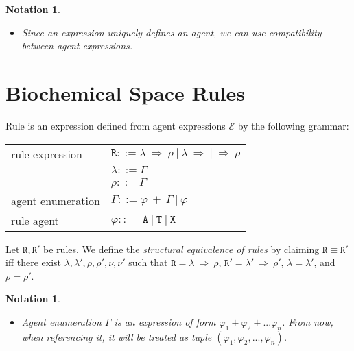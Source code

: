 \documentclass{entcs}
\renewcommand{\~}[0]{\texttildelow}
\newtheorem{notation}[thm]{Notation}
\begin{document}
\begin{notation}
~
\begin{itemize}
\item Since an expression uniquely defines an agent, we can use compatibility between agent expressions.
\end{itemize}
\end{notation}

\section{Biochemical Space Rules}


Rule is an expression defined from agent expressions $\mathcal{E}$ by the following grammar:

\begin{center}
{\small
\hspace*{-1cm}\begin{tabular}{ l l }
 rule expression & $\mathtt{R} ::= \lambda ~\Rightarrow~ \rho ~|~ \lambda ~\Rightarrow ~|~ \Rightarrow~ \rho $\\
  & $\lambda ::= \Gamma$\\
  & $\rho ::= \Gamma$\\
 agent enumeration & $\Gamma ::= \varphi~ +~\Gamma ~|~ \varphi$\\
 rule agent & $\varphi :: = \mathtt{A}~|~\mathtt{T}~|~\mathtt{X}$\\
\end{tabular}
}
\end{center}

\begin{defn}
Let $\mathtt{R},\mathtt{R}'$ be rules. We define the \emph{structural equivalence of rules} by claiming $\mathtt{R} \equiv \mathtt{R}'$ iff there exist $\lambda, \lambda', \rho, \rho', \nu, \nu'$ such that $\mathtt{R}=\lambda ~\Rightarrow~ \rho$, $\mathtt{R}'=\lambda' ~\Rightarrow~ \rho'$, $\lambda=\lambda'$, and $\rho=\rho'$.
\end{defn}

\begin{notation}
~
\begin{itemize}
\item Agent enumeration $\Gamma$ is an expression of form $\varphi_1 + \varphi_2 + ... \varphi_n$. From now, when referencing it, it will be treated as tuple $(\varphi_1, \varphi_2, ..., \varphi_n)$.
\end{itemize}
\end{notation}
\end{document}
